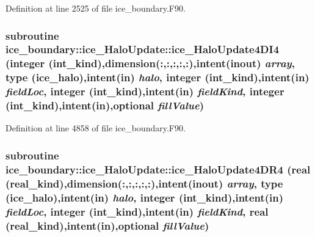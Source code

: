 Definition at line 2525 of file ice\_\-boundary.F90.\hypertarget{interfaceice__boundary_1_1ice__HaloUpdate_aae1cfde7b6634aa39f25bb988a485b70}{
\subsubsection[{ice\_\-HaloUpdate4DI4}]{\setlength{\rightskip}{0pt plus 5cm}subroutine ice\_\-boundary::ice\_\-HaloUpdate::ice\_\-HaloUpdate4DI4 (integer (int\_\-kind),dimension(:,:,:,:,:),intent(inout) {\em array}, \/  type ({\bf ice\_\-halo}),intent(in) {\em halo}, \/  integer (int\_\-kind),intent(in) {\em fieldLoc}, \/  integer (int\_\-kind),intent(in) {\em fieldKind}, \/  integer (int\_\-kind),intent(in),optional {\em fillValue})}}
\label{interfaceice__boundary_1_1ice__HaloUpdate_aae1cfde7b6634aa39f25bb988a485b70}


Definition at line 4858 of file ice\_\-boundary.F90.\hypertarget{interfaceice__boundary_1_1ice__HaloUpdate_a8469112a061e0bb25dbdb7976cbf67de}{
\subsubsection[{ice\_\-HaloUpdate4DR4}]{\setlength{\rightskip}{0pt plus 5cm}subroutine ice\_\-boundary::ice\_\-HaloUpdate::ice\_\-HaloUpdate4DR4 (real (real\_\-kind),dimension(:,:,:,:,:),intent(inout) {\em array}, \/  type ({\bf ice\_\-halo}),intent(in) {\em halo}, \/  integer (int\_\-kind),intent(in) {\em fieldLoc}, \/  integer (int\_\-kind),intent(in) {\em fieldKind}, \/  real (real\_\-kind),intent(in),optional {\em fillValue})}}
\label{interfaceice__boundary_1_1ice__HaloUpdate_a8469112a061e0bb25dbdb7976cbf67de}



